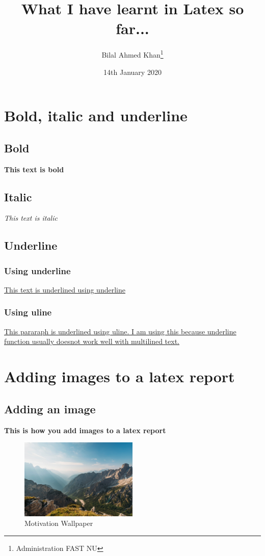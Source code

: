 \documentclass[10pt]{article}
\title{What I have learnt in Latex so far...}
\author{Bilal Ahmed Khan\thanks{Administration FAST NU}}
\date{14th January 2020}
\begin{document}
\maketitle
\tableofcontents
\newpage
\section{Bold, italic and underline}
\subsection{Bold}

\noindent\textbf{This text is bold}
\subsection{Italic}

\noindent\textit{This text is italic}
\subsection{Underline}
\subsubsection{Using underline}

\noindent\underline{This text is underlined using underline}
\subsubsection{Using uline}

\uline{This pararaph is underlined using uline. I am using this because underline function usually doesnot work well with multilined text.}
\section{Adding images to a latex report}
\subsection{Adding an image}
\textbf{This is how you add images to a latex report}

\begin{figure}[h!]
    \centering
    \includegraphics[width =0.5\textwidth]{beautiful mountain pics.jpg}
    \caption{Motivation Wallpaper}
    \label{fig:mountains}
\end{figure}
\end{document}
